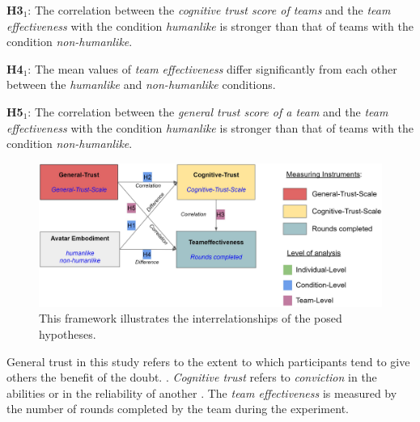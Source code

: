 \documentclass[sigchi]{acmart}
\begin{document}
\textbf{H3$_{1}$}: The correlation between the \textit{cognitive trust score of teams} and the \textit{team effectiveness} with the condition \textit{humanlike} is stronger than that of teams with the condition \textit{non-humanlike}.

\textbf{H4$_{1}$}: The mean values of \textit{team effectiveness} differ significantly from each other between the \textit{humanlike} and \textit{non-humanlike} conditions.

\textbf{H5$_{1}$}: The correlation between the \textit{general trust score of a team} and the \textit{team effectiveness} with the condition \textit{humanlike} is stronger than that of teams with the condition \textit{non-humanlike}.

\begin{figure}[H]
		\begin{footnotesize}
			\includegraphics[width=\linewidth]{Abbildungen/Versuchshypothesen_02.JPG}		
			\caption[The self-constructed framework of experimental hypotheses]{This framework illustrates the interrelationships of the posed hypotheses.}
			\label{Versuchshypothesen}
		\end{footnotesize}
	\end{figure}	

General trust in this study refers to the extent to which participants tend to give others the benefit of the doubt. \citep[S. 30]{mcallister1995affect}.
\textit{Cognitive trust} refers to \textit{conviction} in the abilities or in the reliability of another \citep[S. 30]{mcallister1995affect}.
The \textit{team effectiveness} is measured by the number of rounds completed by the team during the experiment.
\end{document}
